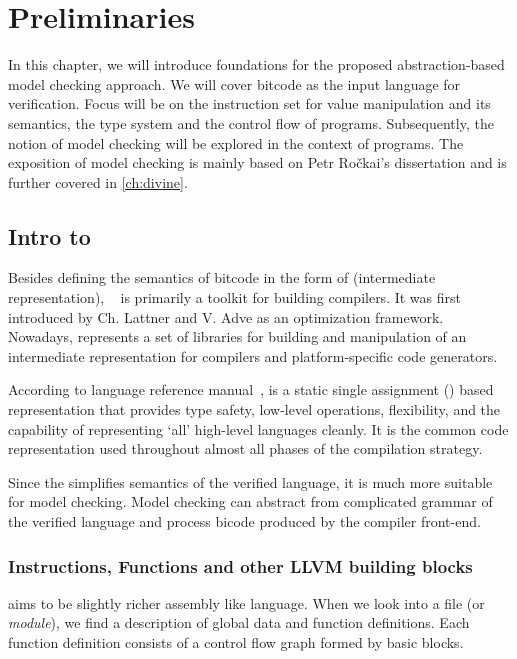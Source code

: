\chapter{Preliminaries}\label{ch:preliminaries}

In this chapter, we will introduce foundations for the proposed
abstraction-based model checking approach. We will cover \LLVM bitcode as the
input language for verification. Focus will be on the instruction set for
value manipulation and its semantics, the \LLVM type system and the control flow
of programs. Subsequently, the notion of model checking will be explored in
the context of \LLVM programs. The exposition of model checking is mainly based on
Petr Ročkai's dissertation \cite{Rockai15} and is further covered in \autoref{ch:divine}.

\section{Intro to \LLVMIR} \label{sec:introtollvm}

Besides defining the semantics of bitcode in the form of \LLVMIR (intermediate
representation), \LLVM{}~\cite{LLVM:web} is primarily a toolkit for building
compilers. It was first introduced by Ch. Lattner and V. Adve \cite{Lattner04}
as an optimization framework. Nowadays, \LLVM represents a set of libraries for
building and manipulation of an intermediate representation for compilers and
platform-specific code generators.

According to \LLVM language reference manual~\cite{LLVM:langref},
\LLVM is a static single assignment (\SSA) based representation that
provides type safety, low-level operations, flexibility, and
the capability of representing ‘all’ high-level languages cleanly. It is the
common code representation used throughout almost all phases of the \LLVM compilation
strategy.

Since the \LLVMIR simplifies semantics of the verified language, it is much more
suitable for model checking. Model checking can abstract from complicated
grammar of the verified language and process \LLVM bicode produced by the compiler
front-end.

\subsection{Instructions, Functions and other LLVM building blocks}
\label{subsec:infnllvm} \LLVMIR aims to be slightly richer assembly like
language. When we look into a \LLVMIR file (or \emph{module}), we find a description of global data and function
definitions. Each function definition consists of a control flow graph formed by
basic blocks.

